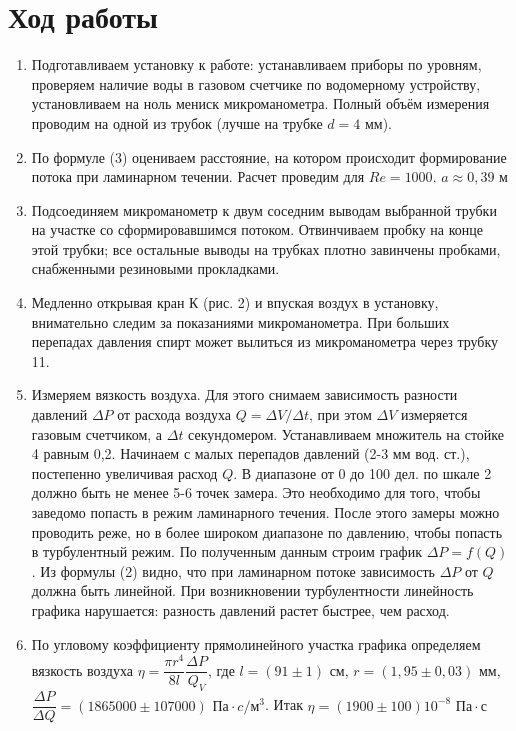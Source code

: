 \documentclass[a4paper, 12pt]{article}%
\begin{document}
\section*{Ход работы}
\begin{enumerate}
\item Подготавливаем установку к работе: устанавливаем приборы по уровням, проверяем наличие воды в газовом счетчике по водомерному устройству, установливаем на ноль мениск микроманометра. Полный объём измерения проводим на одной из трубок (лучше на трубке $d = 4$ мм).
\item По формуле (3) оцениваем расстояние, на котором происходит формирование потока при ламинарном течении. Расчет проведим для $Re
= 1000$. $a \approx 0,39$ м
\item Подсоединяем микроманометр к двум соседним выводам выбранной трубки на участке со сформировавшимся потоком. Отвинчиваем пробку на конце этой трубки; все остальные выводы на трубках плотно завинчены пробками, снабженными резиновыми прокладками.
\item Медленно открывая кран К (рис. 2) и впуская воздух в установку, внимательно следим за показаниями микроманометра. При больших перепадах давления спирт может вылиться из микроманометра через трубку 11.
\item Измеряем вязкость воздуха. Для этого снимаем зависимость разности давлений $\Delta P$ от расхода воздуха $Q =\Delta V/ \Delta t$, при этом $\Delta V$ измеряется газовым счетчиком, а $\Delta t$ секундомером. Устанавливаем множитель на стойке 4 равным 0,2. Начинаем с малых перепадов давлений (2-3 мм вод. ст.), постепенно увеличивая расход $Q$. В диапазоне от 0 до 100 дел. по шкале 2 должно быть не менее 5-6 точек замера. Это необходимо для того, чтобы заведомо попасть в режим ламинарного течения. После этого замеры можно проводить реже, но в более широком диапазоне по давлению, чтобы попасть в турбулентный режим. По полученным данным строим график $\Delta P = f(Q)$. Из формулы (2) видно, что при ламинарном потоке зависимость $\Delta P$ от $Q$ должна быть линейной. При возникновении турбулентности линейность графика нарушается: разность давлений растет быстрее, чем расход.
\item По угловому коэффициенту прямолинейного участка графика определяем вязкость воздуха $\eta = \dfrac{\pi r^4}{8l} \dfrac{\Delta P}{Q_V}$, где $l = (91 \pm 1)$ см, $r = (1,95 \pm 0,03)$ мм, $\dfrac{\Delta P}{\Delta Q} = (1865000 \pm 107000)$ $\text{Па} \cdot c / \text{м}^3$. Итак $\eta = (1900 \pm 100)10^{-8} \text{ Па} \cdot \text{с}$


\end{enumerate}
\end{document}
